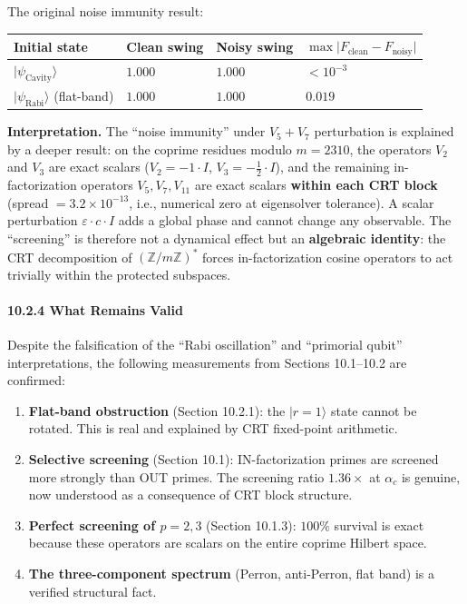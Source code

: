 \documentclass[11pt,letterpaper]{article}
\theoremstyle{definition}
\theoremstyle{remark}
\begin{document}
The original noise immunity result:

\begin{longtable}[]{@{}
  >{\raggedright\arraybackslash}p{}
  >{\raggedright\arraybackslash}p{}
  >{\raggedright\arraybackslash}p{}
  >{\raggedright\arraybackslash}p{}@{}}
\toprule
Initial state & Clean swing & Noisy swing & $\max \lvert F_{\text{clean}} - F_{\text{noisy}}\rvert$ \\
\midrule
\endhead
\bottomrule
$\lvert\psi_{\text{Cavity}}\rangle$ & $1.000$ & $1.000$ & $< 10^{-3}$ \\
$\lvert\psi_{\text{Rabi}}\rangle$ (flat-band) & $1.000$ & $1.000$ & $0.019$ \\
\end{longtable}

\textbf{Interpretation.} The ``noise immunity'' under $V_5 + V_7$ perturbation is explained by a deeper result: on the coprime residues modulo $m = 2310$, the operators $V_2$ and $V_3$ are exact scalars ($V_2 = -1 \cdot I$, $V_3 = -\tfrac{1}{2} \cdot I$), and the remaining in-factorization operators $V_5, V_7, V_{11}$ are exact scalars \textbf{within each CRT block} (spread $= 3.2 \times 10^{-13}$, i.e., numerical zero at eigensolver tolerance). A scalar perturbation $\varepsilon \cdot c \cdot I$ adds a global phase and cannot change any observable. The ``screening'' is therefore not a dynamical effect but an \textbf{algebraic identity}: the CRT decomposition of $(\mathbb{Z}/m\mathbb{Z})^*$ forces in-factorization cosine operators to act trivially within the protected subspaces.

\paragraph{10.2.4 What Remains Valid}\label{what-remains-valid}

Despite the falsification of the ``Rabi oscillation'' and ``primorial qubit'' interpretations, the following measurements from Sections 10.1--10.2 are confirmed:

\begin{enumerate}
\item
  \textbf{Flat-band obstruction} (Section 10.2.1): the $|r = 1\rangle$ state cannot be rotated. This is real and explained by CRT fixed-point arithmetic.
\item
  \textbf{Selective screening} (Section 10.1): IN-factorization primes are screened more strongly than OUT primes. The screening ratio $1.36\times$ at $\alpha_c$ is genuine, now understood as a consequence of CRT block structure.
\item
  \textbf{Perfect screening of $p = 2, 3$} (Section 10.1.3): $100\%$ survival is exact because these operators are scalars on the entire coprime Hilbert space.
\item
  \textbf{The three-component spectrum} (Perron, anti-Perron, flat band) is a verified structural fact.
\end{enumerate}
\end{document}
